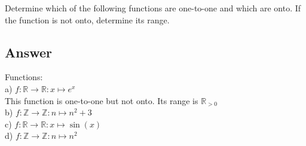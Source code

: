 \documentclass[
	12pt, %
]{fphw}
\newcommand\R{\mathbb{R}}
\newcommand\Z{\mathbb{Z}}
\begin{document}
\begin{problem}
Determine which of the following functions are one-to-one and which are onto. If the function is not onto, determine its range.
\end{problem}


\subsection*{Answer}
Functions:\\
a) $f : \R \to \R : x \mapsto e^x$ \\
This function is one-to-one but not onto. Its range is $\R _{>0}$\\
b) $f : \Z \to \Z : n \mapsto n^2 + 3$ \\
c) $f : \R \to \R : x \mapsto \sin(x)$ \\
d) $f : \Z \to \Z : n \mapsto n^2$ \\

\end{document}
